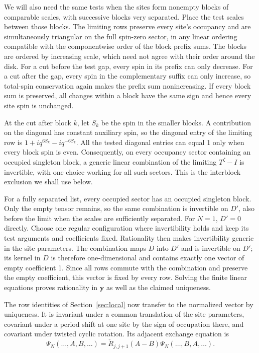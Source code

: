 We will also need the same tests when the sites form nonempty blocks of comparable scales, with successive blocks very separated. Place the test scales between those blocks. The limiting rows preserve every site's occupancy and are simultaneously triangular on the full spin-zero sector, in any linear ordering compatible with the componentwise order of the block prefix sums. The blocks are ordered by increasing scale, which need not agree with their order around the disk. For a cut before the test gap, every spin in its prefix can only decrease. For a cut after the gap, every spin in the complementary suffix can only increase, so total-spin conservation again makes the prefix sum nonincreasing. If every block sum is preserved, all changes within a block have the same sign and hence every site spin is unchanged.

At the cut after block \(k\), let \(S_k\) be the spin in the smaller blocks. A contribution on the diagonal has constant auxiliary spin, so the diagonal entry of the limiting row is \(1+i q^{6S_k}-i q^{-6S_k}\). All the tested diagonal entries can equal 1 only when every block spin is even. Consequently, on every occupancy sector containing an occupied singleton block, a generic linear combination of the limiting \(T^\zeta-I\) is invertible, with one choice working for all such sectors. This is the interblock exclusion we shall use below.

For a fully separated list, every occupied sector has an occupied singleton block. Only the empty tensor remains, so the same combination is invertible on \(D'\), also before the limit when the scales are sufficiently separated. For \(N=1\), \(D'=0\) directly. Choose one regular configuration where invertibility holds and keep its test arguments and coefficients fixed. Rationality then makes invertibility generic in the site parameters. The combination maps \(D\) into \(D'\) and is invertible on \(D'\); its kernel in \(D\) is therefore one-dimensional and contains exactly one vector of empty coefficient 1. Since all rows commute with the combination and preserve the empty coefficient, this vector is fixed by every row. Solving the finite linear equations proves rationality in \(\mathbf y\) as well as the claimed uniqueness.

The row identities of Section~\ref{sec:local} now transfer to the normalized vector by uniqueness. It is invariant under a common translation of the site parameters, covariant under a period shift at one site by the sign of occupation there, and covariant under twisted cyclic rotation. Its adjacent exchange equation is
\[
 \Psi_N(\ldots,A,B,\ldots)=\check R_{j,j+1}(A-B)\Psi_N(\ldots,B,A,\ldots).
\]

